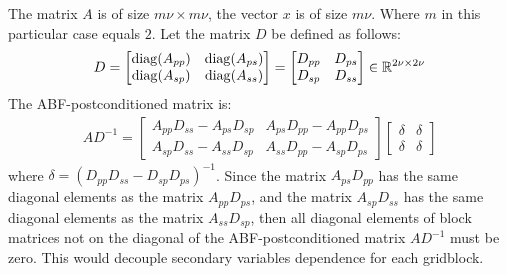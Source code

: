 The matrix $A$ is of size $m\nu\times m\nu$, the vector $x$ is of size $m\nu$. Where $m$ in this particular case equals $2$.
Let the matrix $D$ be defined as follows:
\begin{align}
	D=
\begin{bmatrix}
	\operatorname{diag}(A_{pp}) & \operatorname{diag}(A_{ps})\\
	\operatorname{diag}(A_{sp}) & \operatorname{diag}(A_{ss})
\end{bmatrix} =
\begin{bmatrix}
	D_{pp} & D_{ps}\\
	D_{sp} & D_{ss}
\end{bmatrix}
\in \mathbb{R}^{2\nu\times2\nu}
\end{align}
The ABF-postconditioned matrix is:
\begin{align}
	AD^{-1}=
\begin{bmatrix}
	A_{pp}D_{ss}-A_{ps}D_{sp} & A_{ps}D_{pp}-A_{pp}D_{ps}\\
	A_{sp}D_{ss}-A_{ss}D_{sp} & A_{ss}D_{pp}-A_{sp}D_{ps}
\end{bmatrix}
\begin{bmatrix}
	\delta & \delta\\
	\delta & \delta
\end{bmatrix}
\end{align}
where $\delta = (D_{pp}D_{ss}-D_{sp}D_{ps})^{-1}$. 
Since the matrix $A_{ps}D_{pp}$ has the same diagonal elements as the matrix $A_{pp}D_{ps}$,
and the matrix $A_{sp}D_{ss}$ has the same diagonal elements as the matrix $A_{ss}D_{sp}$, then
all diagonal elements of block matrices not on the diagonal of the ABF-postconditioned matrix $AD^{-1}$
must be zero. This would decouple secondary variables dependence for each gridblock.
